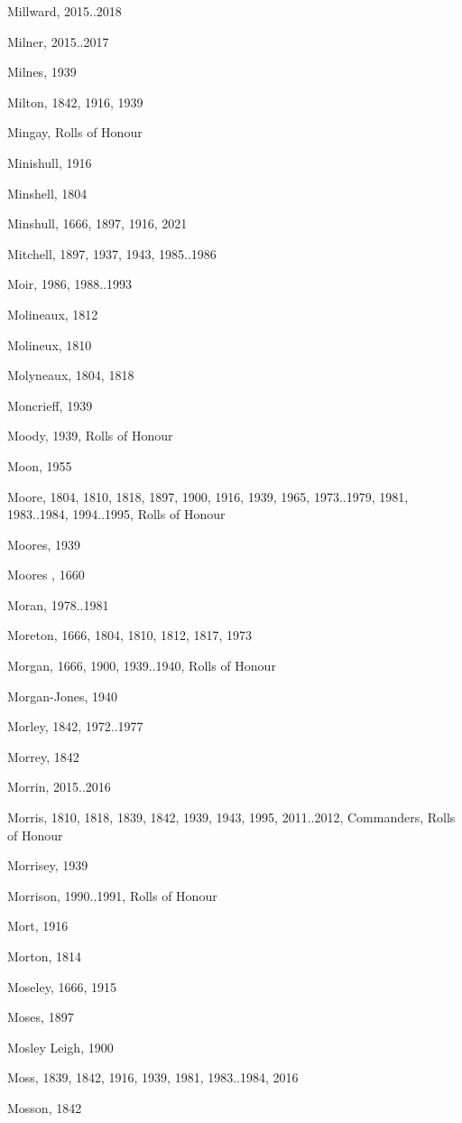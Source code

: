 \begin{theindex}
\item Millward, 2015..2018
\item Milner, 2015..2017
\item Milnes, 1939
\item Milton, 1842, 1916, 1939
\item Mingay, Rolls of Honour
\item Minishull, 1916
\item Minshell, 1804
\item Minshull, 1666, 1897, 1916, 2021
\item Mitchell, 1897, 1937, 1943, 1985..1986
\item Moir, 1986, 1988..1993
\item Molineaux, 1812
\item Molineux, 1810
\item Molyneaux, 1804, 1818
\item Moncrieff, 1939
\item Moody, 1939, Rolls of Honour
\item Moon, 1955
\item Moore, 1804, 1810, 1818, 1897, 1900, 1916, 1939, 1965, 1973..1979, 1981, 1983..1984, 1994..1995, Rolls of Honour
\item Moores, 1939
\item Moores , 1660
\item Moran, 1978..1981
\item Moreton, 1666, 1804, 1810, 1812, 1817, 1973
\item Morgan, 1666, 1900, 1939..1940, Rolls of Honour
\item Morgan-Jones, 1940
\item Morley, 1842, 1972..1977
\item Morrey, 1842
\item Morrin, 2015..2016
\item Morris, 1810, 1818, 1839, 1842, 1939, 1943, 1995, 2011..2012, Commanders, Rolls of Honour
\item Morrisey, 1939
\item Morrison, 1990..1991, Rolls of Honour
\item Mort, 1916
\item Morton, 1814
\item Moseley, 1666, 1915
\item Moses, 1897
\item Mosley Leigh, 1900
\item Moss, 1839, 1842, 1916, 1939, 1981, 1983..1984, 2016
\item Mosson, 1842

\end{theindex}
